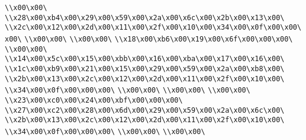 \verb|\\x00\x00\|\newline
\verb|\\x28\x00\xb4\x00\x29\x00\x59\x00\x2a\x00\x6c\x00\x2b\x00\x13\x00\|\newline
\verb|\\x2c\x00\x12\x00\x2d\x00\x11\x00\x2f\x00\x10\x00\x34\x00\x0f\x00\x00\x00\|\newline
\verb|\\x00\x00\|\newline
\verb|\\x00\x00\|\newline
\verb|\\x18\x00\xb6\x00\x19\x00\x6f\x00\x00\x00\|\newline
\verb|\\x00\x00\|\newline
\verb|\\x14\x00\x5c\x00\x15\x00\xbb\x00\x16\x00\xba\x00\x17\x00\x16\x00\|\newline
\verb|\\x1c\x00\xb9\x00\x21\x00\x15\x00\x29\x00\x59\x00\x2a\x00\xb8\x00\|\newline
\verb|\\x2b\x00\x13\x00\x2c\x00\x12\x00\x2d\x00\x11\x00\x2f\x00\x10\x00\|\newline
\verb|\\x34\x00\x0f\x00\x00\x00\|\newline
\verb|\\x00\x00\|\newline
\verb|\\x00\x00\|\newline
\verb|\\x00\x00\|\newline
\verb|\\x23\x00\xc0\x00\x24\x00\xbf\x00\x00\x00\|\newline
\verb|\\x27\x00\xc2\x00\x28\x00\x6d\x00\x29\x00\x59\x00\x2a\x00\x6c\x00\|\newline
\verb|\\x2b\x00\x13\x00\x2c\x00\x12\x00\x2d\x00\x11\x00\x2f\x00\x10\x00\|\newline
\verb|\\x34\x00\x0f\x00\x00\x00\|\newline
\verb|\\x00\x00\|\newline
\verb|\\x00\x00\|\newline
